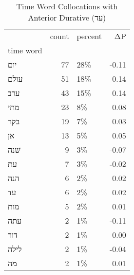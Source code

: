 \begin{table}[htbp!]
\centering
\caption{Time Word Collocations with Anterior Durative (עד)}
\label{table:antdurעד_head_cpd}
\begin{tabular}{lrlr}
\toprule
{} &  count & percent &    ΔP \\
time word &        &         &       \\
\midrule
יום       &     77 &     28\% & -0.11 \\
עולם      &     51 &     18\% &  0.14 \\
ערב       &     43 &     15\% &  0.14 \\
מתי       &     23 &      8\% &  0.08 \\
בקר       &     19 &      7\% &  0.03 \\
אן        &     13 &      5\% &  0.05 \\
שׁנה      &      9 &      3\% & -0.07 \\
עת        &      7 &      3\% & -0.02 \\
הנה       &      6 &      2\% &  0.02 \\
עד        &      6 &      2\% &  0.02 \\
מות       &      5 &      2\% &  0.01 \\
עתה       &      2 &      1\% & -0.11 \\
דור       &      2 &      1\% &  0.00 \\
לילה      &      2 &      1\% & -0.04 \\
מה        &      2 &      1\% &  0.01 \\
\bottomrule
\end{tabular}
\end{table}
